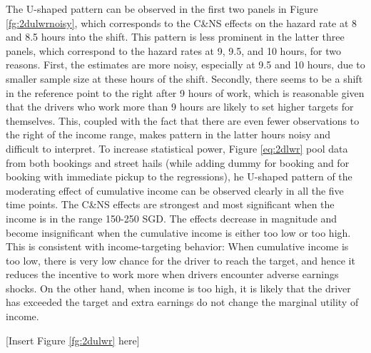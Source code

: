 \documentclass[reviewmode]{restat}
\begin{document}
The U-shaped pattern can be observed in the first two panels in Figure \ref{fg:2dulwrnoisy}, which corresponds to the C\&NS effects on the hazard rate at 8 and 8.5 hours into the shift. This pattern is less prominent in the latter three panels, which correspond to the hazard rates at 9, 9.5, and 10 hours, for two reasons. First, the estimates are more noisy, especially at 9.5 and 10 hours, due to smaller sample size at these hours of the shift. Secondly, there seems to be a shift in the reference point  to the right after 9 hours of work, which is reasonable given that the drivers who work more than 9 hours are likely to set higher targets for themselves. This, coupled with the fact that there are even fewer observations to the right of the income range, makes pattern in the latter hours noisy and difficult to interpret. To increase statistical power, Figure \ref{eq:2dlwr} pool data from both bookings and street hails (while adding dummy for booking and for booking with immediate pickup to the regressions), he U-shaped pattern of the moderating effect of cumulative income can be observed clearly in all the five time points. The C\&NS effects are strongest and most significant when the income is in the range 150-250 SGD. The effects decrease in magnitude and become insignificant when the cumulative income is either too low or too high. This is consistent with income-targeting behavior: When cumulative income is too low, there is very low chance for the driver to reach the target, and hence it reduces the incentive to work more when drivers encounter adverse earnings shocks. On the other hand, when income is too high, it is likely that the driver has exceeded the target and extra earnings do not change the marginal utility of income.


\begin{center}
	[Insert Figure \ref{fg:2dulwr} here]
\end{center}

\end{document}

